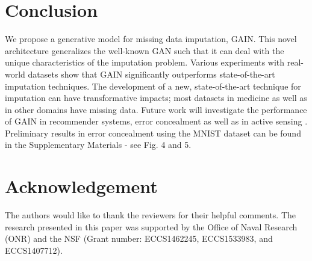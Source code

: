 \documentclass{article}
\begin{document}
\section{Conclusion}\label{sect:conclusion}
We propose a generative model for missing data imputation, GAIN. This novel architecture generalizes the well-known GAN such that it can deal with the unique characteristics of the imputation problem. Various experiments with real-world datasets show that GAIN significantly outperforms state-of-the-art imputation techniques. The development of a new, state-of-the-art technique for imputation can have transformative impacts; most datasets in medicine as well as in other domains have missing data. Future work will investigate the performance of GAIN in recommender systems, error concealment as well as in active sensing \cite{activesensing}. Preliminary results in error concealment using the MNIST dataset \cite{mnist} can be found in the Supplementary Materials - see Fig. 4 and 5. 

\newpage
\section*{Acknowledgement}
The authors would like to thank the reviewers for their helpful comments. The research presented in this paper was supported by the Office of Naval Research (ONR) and the NSF (Grant number: ECCS1462245, ECCS1533983, and ECCS1407712).
\end{document}

